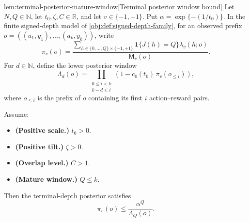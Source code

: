 \documentclass[11pt]{article}
\begin{document}
\begin{lemmav}{lem:terminal-posterior-mature-window}[Terminal posterior window bound]
Let \(N,Q\in\mathbb N\), let \(t_0,\zeta,C\in\mathbb R\), and let \(v\in\{-1,+1\}\).  Put \(\alpha=\exp\{-(1/t_0)\}\).  In the finite signed-depth model of \cref{obj:def:signed-depth-family}, for an observed prefix \(o=((a_1,y_1),\ldots,(a_k,y_k))\), write
\[
\pi_v(o)
=
\frac{
\sum_{h\in\{0,\ldots,Q\}\times\{-1,+1\}}
\mathbf 1\{J(h)=Q\}\lambda_v(h;o)
}{
\mathsf M_v(o)
}.
\]
For \(d\in\mathbb N\), define the lower posterior window
\[
\Lambda_d(o)
=
\prod_{\substack{0\le i<k\\ k-d\le i}}
\left(1-c_0(t_0)\,\pi_v(o_{\le i})\right),
\]
where \(o_{\le i}\) is the prefix of \(o\) containing its first \(i\) action--reward pairs.

Assume:
\begin{itemize}
\item \textbf{(Positive scale.)} \(t_0>0\).
\item \textbf{(Positive tilt.)} \(\zeta>0\).
\item \textbf{(Overlap level.)} \(C>1\).
\item \textbf{(Mature window.)} \(Q\le k\).
\end{itemize}
Then the terminal-depth posterior satisfies
\[
\pi_v(o)
\le
\frac{\alpha^Q}{\Lambda_Q(o)}.
\]
\end{lemmav}
\end{document}
